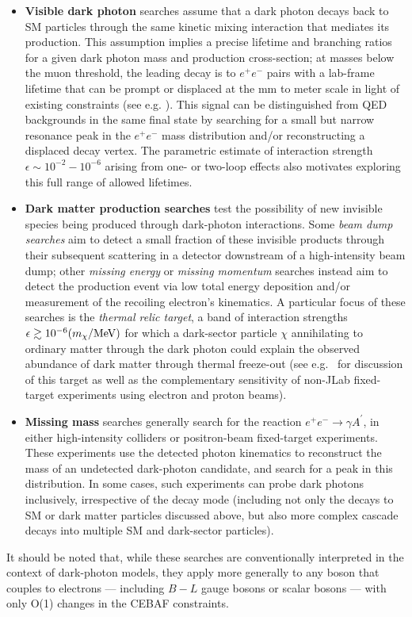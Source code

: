 \begin{itemize}
\item\textbf{Visible dark photon} searches assume that a dark photon decays back to SM particles through the same kinetic mixing interaction that mediates its production.   This assumption implies a precise lifetime and branching ratios for a given dark photon mass and production cross-section; at masses below the muon threshold, the leading decay is to $e^+e^-$ pairs with a lab-frame lifetime that can be prompt or displaced at the mm to meter scale in light of existing constraints (see e.g. \cite{Bjorken:2009mm,Lanfranchi:2020crw}).   This signal can be distinguished from QED backgrounds in the same final state by searching for a small but narrow resonance peak in the $e^+e^-$ mass distribution and/or reconstructing a displaced decay vertex. The parametric estimate of interaction strength $\epsilon \sim 10^{-2} - 10^{-6}$ arising from one- or two-loop effects also motivates exploring this full range of allowed lifetimes.
\item\textbf{Dark matter production searches} test the possibility of new invisible species being produced through dark-photon interactions. Some \emph{beam dump searches} aim to detect a small fraction of these invisible products through their subsequent scattering in a detector downstream of a high-intensity beam dump; other \emph{missing energy} or \emph{missing momentum} searches instead aim to detect the production event via low total energy deposition and/or measurement of the recoiling electron's kinematics.  A particular focus of these searches is the \emph{thermal relic target}, a band of interaction strengths $\epsilon \gtrsim 10^{-6} (m_\chi/\rm{MeV})$ for which a dark-sector particle $\chi$ annihilating to ordinary matter through the dark photon could explain the observed abundance of dark matter through thermal freeze-out (see e.g.~\cite{Battaglieri:2017aum,DarkMatterBRNReport,Berlin:2020uwy} for discussion of this target as well as the complementary sensitivity of non-JLab fixed-target experiments using electron and proton beams). 
\item\textbf{Missing mass} searches generally search for the reaction $e^+e^- \rightarrow \gamma A^\prime$, in either high-intensity colliders or positron-beam fixed-target experiments.  These experiments use the detected photon kinematics to reconstruct the mass of an undetected dark-photon candidate, and search for a peak in this distribution.  In some cases, such experiments can probe dark photons inclusively, irrespective of the decay mode (including not only the decays to SM or dark matter particles discussed above, but also more complex cascade decays into multiple SM and dark-sector particles).  
\end{itemize}
It should be noted that, while these searches are conventionally interpreted in the context of dark-photon models, they apply more generally to any boson that couples to electrons --- including $B-L$ gauge bosons or scalar bosons --- with only O(1) changes in the CEBAF constraints. 


